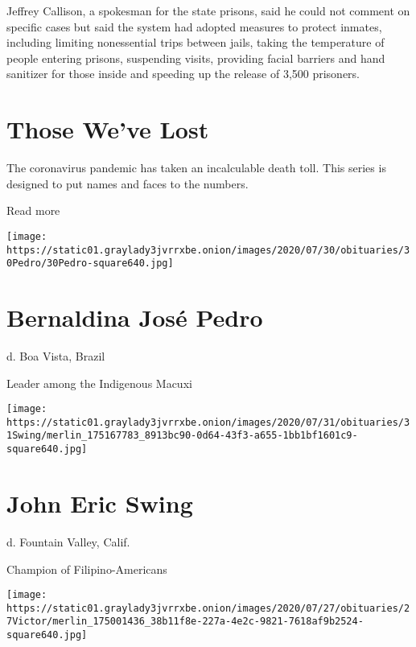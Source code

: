 Jeffrey Callison, a spokesman for the state prisons, said he could not
comment on specific cases but said the system had adopted measures to
protect inmates, including limiting nonessential trips between jails,
taking the temperature of people entering prisons, suspending visits,
providing facial barriers and hand sanitizer for those inside and
speeding up the release of 3,500 prisoners.

\href{https://www.nytimes3xbfgragh.onion/interactive/2020/obituaries/people-died-coronavirus-obituaries.html?action=click\&pgtype=Article\&state=default\&region=BELOW_MAIN_CONTENT\&context=covid_obits_promo}{}

\hypertarget{those-weve-lost}{%
\section{Those We've Lost}\label{those-weve-lost}}

The coronavirus pandemic has taken an incalculable death toll. This
series is designed to put names and faces to the numbers.

Read more

\texttt{[image: https://static01.graylady3jvrrxbe.onion/images/2020/07/30/obituaries/30Pedro/30Pedro-square640.jpg]}

\hypertarget{bernaldina-josuxe9-pedro}{%
\section{Bernaldina José Pedro}\label{bernaldina-josuxe9-pedro}}

d. Boa Vista, Brazil

Leader among the Indigenous Macuxi

\texttt{[image: https://static01.graylady3jvrrxbe.onion/images/2020/07/31/obituaries/31Swing/merlin\_175167783\_8913bc90-0d64-43f3-a655-1bb1bf1601c9-square640.jpg]}

\hypertarget{john-eric-swing}{%
\section{John Eric Swing}\label{john-eric-swing}}

d. Fountain Valley, Calif.

Champion of Filipino-Americans

\texttt{[image: https://static01.graylady3jvrrxbe.onion/images/2020/07/27/obituaries/27Victor/merlin\_175001436\_38b11f8e-227a-4e2c-9821-7618af9b2524-square640.jpg]}

